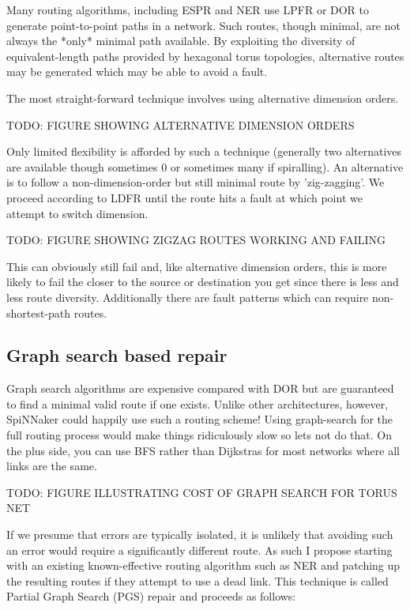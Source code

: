 			Many routing algorithms, including ESPR and NER use LPFR or DOR to
			generate point-to-point paths in a network. Such routes, though minimal,
			are not always the *only* minimal path available. By exploiting the
			diversity of equivalent-length paths provided by hexagonal torus
			topologies, alternative routes may be generated which may be able to
			avoid a fault.
			
			The most straight-forward technique involves using alternative dimension
			orders.
			
			TODO: FIGURE SHOWING ALTERNATIVE DIMENSION ORDERS
			
			Only limited flexibility is afforded by such a technique (generally two
			alternatives are available though sometimes 0 or sometimes many if
			spiralling). An alternative is to follow a non-dimension-order but still
			minimal route by 'zig-zagging'. We proceed according to LDFR until the
			route hits a fault at which point we attempt to switch dimension.
			
			TODO: FIGURE SHOWING ZIGZAG ROUTES WORKING AND FAILING
			
			This can obviously still fail and, like alternative dimension orders,
			this is more likely to fail the closer to the source or destination you
			get since there is less and less route diversity. Additionally there are
			fault patterns which can require non-shortest-path routes.
		
		\subsection{Graph search based repair}
			
			Graph search algorithms are expensive compared with DOR but are
			guaranteed to find a minimal valid route if one exists. Unlike other
			architectures, however, SpiNNaker could happily use such a routing
			scheme! Using graph-search for the full routing process would make things
			ridiculously slow so lets not do that. On the plus side, you can use BFS
			rather than Dijkstras for most networks where all links are the same.
			
			TODO: FIGURE ILLUSTRATING COST OF GRAPH SEARCH FOR TORUS NET
			
			If we presume that errors are typically isolated, it is unlikely that
			avoiding such an error would require a significantly different route. As
			such I propose starting with an existing known-effective routing
			algorithm such as NER and patching up the resulting routes if they
			attempt to use a dead link. This technique is called Partial Graph Search
			(PGS) repair and proceeds as follows:
			
